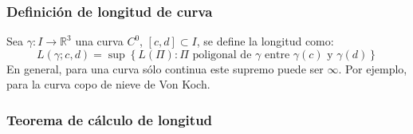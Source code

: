 \documentclass[12pt]{article}
\theoremstyle{plain}
\newcommand{\R}{\mathbb{R}}
\newcommand{\appl}[3]{#1 \colon #2 \longrightarrow #3}
\newcommand{\ds}{\displaystyle}
\newcommand{\tex}[1]{\text{#1}}
\begin{document}
\subsubsection{Definición de longitud de curva}
\begin{defn}
	Sea $\appl{\gamma}{I}{\R^3}$ una curva $C^0$, $\left[c,d\right] \subset  I$, se define la longitud como: \[\ds L(\gamma; c, d)=\sup \left\{L(\Pi) : \Pi\tex{ poligonal de } \gamma \tex{ entre }\gamma(c)\tex{ y }\gamma(d)\right\}\]
	En general, para una curva sólo continua este supremo puede ser $\infty$. Por ejemplo, para la curva copo de nieve de Von Koch.
\end{defn}

\subsubsection{Teorema de cálculo de longitud}
\end{document}
